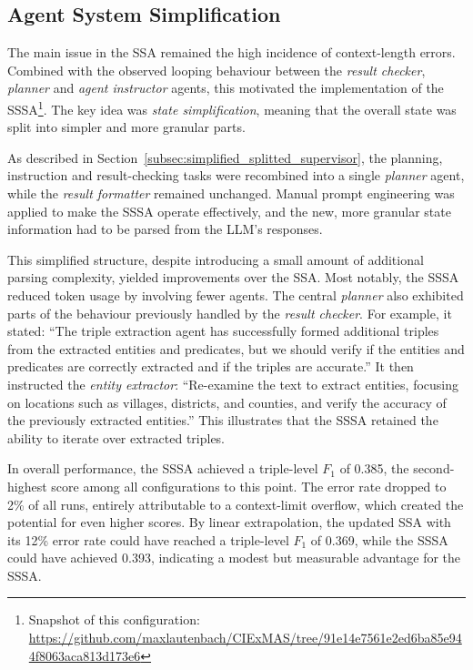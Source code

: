 \documentclass[a4paper,oneside,bibliography=totoc]{scrbook}
\begin{document}
\subsection{Agent System Simplification}
\label{subsec:task_simplification_state_refinement}

The main issue in the \ac{SSA} remained the high incidence of context-length errors. Combined with the observed looping behaviour between the \textit{result checker}, \textit{planner} and \textit{agent instructor} agents, this motivated the implementation of the \ac{SSSA}\footnote{Snapshot of this configuration: \url{https://github.com/maxlautenbach/CIExMAS/tree/91e14e7561e2ed6ba85e944f8063aca813d173e6}}. The key idea was \textit{state simplification}, meaning that the overall state was split into simpler and more granular parts.

As described in Section~\ref{subsec:simplified_splitted_supervisor}, the planning, instruction and result-checking tasks were recombined into a single \textit{planner} agent, while the \textit{result formatter} remained unchanged. Manual prompt engineering was applied to make the \ac{SSSA} operate effectively, and the new, more granular state information had to be parsed from the \ac{LLM}’s responses.

This simplified structure, despite introducing a small amount of additional parsing complexity, yielded improvements over the \ac{SSA}. Most notably, the \ac{SSSA} reduced token usage by involving fewer agents. The central \textit{planner} also exhibited parts of the behaviour previously handled by the \textit{result checker}. For example, it stated: \enquote{The triple extraction agent has successfully formed additional triples from the extracted entities and predicates, but we should verify if the entities and predicates are correctly extracted and if the triples are accurate.} It then instructed the \textit{entity extractor}: \enquote{Re-examine the text to extract entities, focusing on locations such as villages, districts, and counties, and verify the accuracy of the previously extracted entities.} This illustrates that the \ac{SSSA} retained the ability to iterate over extracted triples.

In overall performance, the \ac{SSSA} achieved a triple-level $F_{1}$ of 0.385, the second-highest score among all configurations to this point. The error rate dropped to 2\% of all runs, entirely attributable to a context-limit overflow, which created the potential for even higher scores. By linear extrapolation, the updated \ac{SSA} with its 12\% error rate could have reached a triple-level $F_{1}$ of 0.369, while the \ac{SSSA} could have achieved 0.393, indicating a modest but measurable advantage for the \ac{SSSA}.
\end{document}
